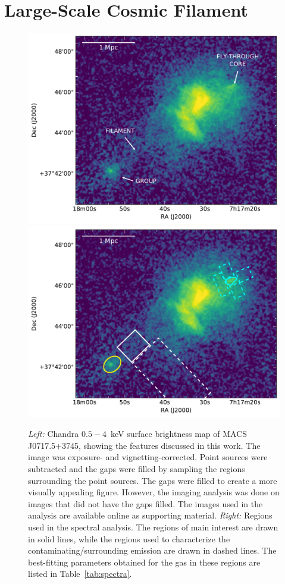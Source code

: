 \section{Large-Scale Cosmic Filament}
\label{sec:Filament}

\begin{figure}
    \includegraphics[width=\columnwidth]{plots/fil-labels.pdf}
    \includegraphics[width=\columnwidth]{plots/fil-regions.pdf}
    \caption{\emph{Left:} Chandra $0.5-4$~keV surface brightness map of MACS J0717.5+3745, showing the features discussed in this work. The image was exposure- and vignetting-corrected. Point sources were subtracted and the gaps were filled by sampling the regions surrounding the point sources. The gaps were filled to create a more visually appealing figure. However, the imaging analysis was done on images that did not have the gaps filled. The images used in the analysis are available online as supporting material. \emph{Right:} Regions used in the spectral analysis. The regions of main interest are drawn in solid lines, while the regions used to characterize the contaminating/surrounding emission are drawn in dashed lines. The best-fitting parameters obtained for the gas in these regions are listed in Table~\ref{tab:spectra}. \label{fig:fil}}
\end{figure}

